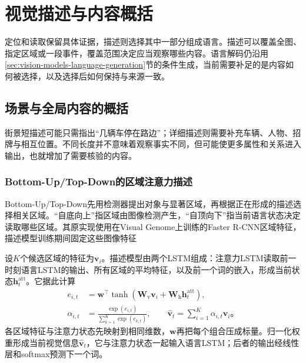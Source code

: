 \section{视觉描述与内容概括}
\label{sec:vision-understanding-description}

定位和读取保留具体证据，描述则选择其中一部分组成语言。描述可以覆盖全图、指定区域或一段事件，覆盖范围决定应当观察哪些内容。语言解码仍沿用\ref{sec:vision-models-language-generation}节的条件生成，当前需要补足的是内容如何被选择，以及选择后如何保持与来源一致。

\subsection{场景与全局内容的概括}
\label{sec:vision-understanding-global-caption}

街景短描述可能只需指出“几辆车停在路边”；详细描述则需要补充车辆、人物、招牌与相互位置。不同长度并不意味着观察事实不同，但可能使更多属性和关系进入输出，也就增加了需要核验的内容。

\subsubsection{Bottom-Up/Top-Down的区域注意力描述}
\label{sec:vision-understanding-bottomup}

Bottom-Up/Top-Down先用检测器提出对象与显著区域，再根据正在形成的描述选择相关区域。“自底向上”指区域由图像检测产生，“自顶向下”指当前语言状态决定读取哪些区域。其原实现使用在Visual Genome上训练的Faster R-CNN区域特征，描述模型训练期间固定这些图像特征

设$K$个候选区域的特征为$\bm v_i$。描述模型由两个LSTM组成：注意力LSTM读取前一时刻语言LSTM的输出、所有区域的平均特征，以及前一个词的嵌入，形成当前状态$\bm h_t^{\mathrm{att}}$。它据此计算
\begin{equation}
  \begin{aligned}
    e_{i,t}&=\bm w^\top\tanh(\bm W_{\mathrm v}\bm v_i
                             +\bm W_{\mathrm h}\bm h_t^{\mathrm{att}}),\\
    \alpha_{i,t}&=\frac{\exp(e_{i,t})}{\sum_{k=1}^{K}\exp(e_{k,t})},
    \qquad
    \hat{\bm v}_t=\sum_{i=1}^{K}\alpha_{i,t}\bm v_i\text{。}
  \end{aligned}
  \label{eq:vision-caption-attention}
\end{equation}
各区域特征与注意力状态先映射到相同维数，$\bm w$再把每个组合压成标量。归一化权重形成当前视觉信息$\hat{\bm v}_t$，它与注意力状态一起输入语言LSTM；后者的输出经线性层和softmax预测下一个词。

